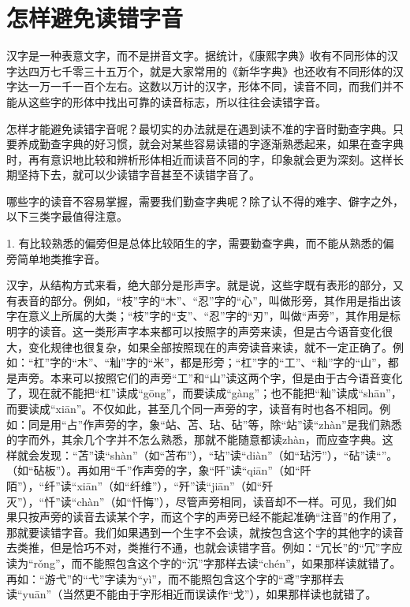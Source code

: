 \section{怎样避免读错字音}

汉字是一种表意文字，而不是拼音文字。据统计，《康熙字典》收有不同形体的汉字达四万七千零三十五万个，就是大家常用的《新华字典》也还收有不同形体的汉字达一万一千一百个左右。这数以万计的汉字，形体不同，读音不同，而我们并不能从这些字的形体中找出可靠的读音标志，所以往往会读错字音。

怎样才能避免读错字音呢？最切实的办法就是在遇到读不准的字音时勤查字典。只要养成勤查字典的好习惯，就会对某些容易读错的字逐渐熟悉起来，如果在查字典时，再有意识地比较和辨析形体相近而读音不同的字，印象就会更为深刻。这样长期坚持下去，就可以少读错字音甚至不读错字音了。

哪些字的读音不容易掌握，需要我们勤查字典呢？除了认不得的难字、僻字之外，以下三类字最值得注意。

1. 有比较熟悉的偏旁但是总体比较陌生的字，需要勤查字典，而不能从熟悉的偏旁简单地类推字音。

汉字，从结构方式来看，绝大部分是形声字。就是说，这些字既有表形的部分，又有表音的部分。例如，“枝”字的“木”、“忍”字的“心”，叫做形旁，其作用是指出该字在意义上所属的大类；“枝”字的“支”、“忍”字的“刃”，叫做“声旁”，其作用是标明字的读音。这一类形声字本来都可以按照字的声旁来读，但是古今语音变化很大，变化规律也很复杂，如果全部按照现在的声旁读音来读，就不一定正确了。例如：“杠”字的“木”、“籼”字的“米”，都是形旁；“杠”字的“工”、“籼”字的“山”，都是声旁。本来可以按照它们的声旁“工”和“山”读这两个字，但是由于古今语音变化了，现在就不能把“杠”读成“gōng”，而要读成“gàng”；也不能把“籼”读成“shān”，而要读成“xiān”。不仅如此，甚至几个同一声旁的字，读音有时也各不相同。例如：同是用“占”作声旁的字，象“站、苫、玷、砧”等，除“站”读“zhàn”是我们熟悉的字而外，其余几个字并不怎么熟悉，那就不能随意都读zhàn，而应查字典。这样就会发现：“苫”读“shàn”（如“苫布”），“玷”读“diàn”（如“玷污”），“砧”读“”。（如“砧板”）。再如用“千”作声旁的字，象“阡”读“qiān”（如“阡\\ 陌”），“纤”读“xiān”（如“纤维”），“歼”读“jiān”（如“歼灭”），“忏”读“chàn”（如“忏悔”），尽管声旁相同，读音却不一样。可见，我们如果只按声旁的读音去读某个字，而这个字的声旁已经不能起准确“注音”的作用了，那就要读错字音。我们如果遇到一个生字不会读，就按包含这个字的其他字的读音去类推，但是恰巧不对，类推行不通，也就会读错字音。例如：“冗长”的“冗”字应读为“rǒng”，而不能照包含这个字的“沉”字那样去读“chén”，如果那样读就错了。再如：“游弋”的“弋”字读为“yì”，而不能照包含这个字的“鸢”字那样去读“yuān”（当然更不能由于字形相近而误读作“戈”），如果那样读也就错了。

